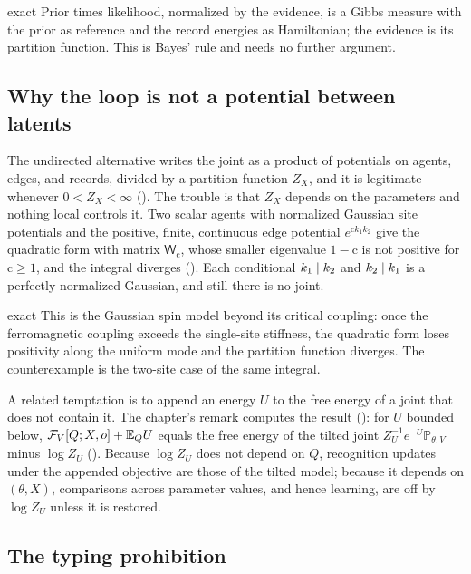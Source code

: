 \begin{analogy}{exact}
Prior times likelihood, normalized by the evidence, is a Gibbs measure with the prior as reference and the
record energies as Hamiltonian; the evidence is its partition function. This is Bayes' rule and needs no further
argument.
\end{analogy}

\subsection{Why the loop is not a potential between latents}

The undirected alternative writes the joint as a product of potentials on agents, edges, and records, divided by
a partition function $Z_X$, and it is legitimate whenever $0<Z_X<\infty$ (). The
trouble is that $Z_X$ depends on the parameters and nothing local controls it. Two scalar agents with normalized
Gaussian site potentials and the positive, finite, continuous edge potential $e^{\mathrm ck_1k_2}$ give the
quadratic form with matrix $\mathsf W_{\mathrm c}$, whose smaller eigenvalue $1-\mathrm c$ is not positive for
$\mathrm c\geq1$, and the integral diverges (). Each conditional
$k_1\mid k_2$ and $k_2\mid k_1$ is a perfectly normalized Gaussian, and still there is no joint.

\begin{analogy}{exact}
This is the Gaussian spin model beyond its critical coupling: once the ferromagnetic coupling exceeds the
single-site stiffness, the quadratic form loses positivity along the uniform mode and the partition function
diverges. The counterexample is the two-site case of the same integral.
\end{analogy}

A related temptation is to append an energy $U$ to the free energy of a joint that does not contain it. The
chapter's remark computes the result (): for $U$ bounded below,
$\mathcal F_V[Q;X,o]+\mathbb E_QU$ equals the free energy of the tilted joint $Z_U^{-1}e^{-U}\mathbb P_{\theta,V}$ minus
$\log Z_U$ (). Because $\log Z_U$ does not depend on $Q$, recognition updates under
the appended objective are those of the tilted model; because it depends on $(\theta,X)$, comparisons across
parameter values, and hence learning, are off by $\log Z_U$ unless it is restored.

\subsection{The typing prohibition}

